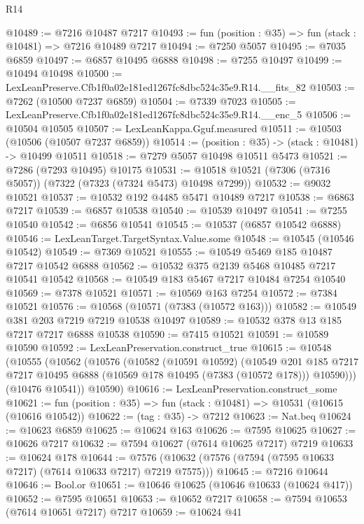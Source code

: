 \begin{lexlean}{R14}
\begin{coremodule}
@10489 := @7216 @10487 @7217
@10493 := fun (position : @35) => fun (stack : @10481) => @7216 @10489 @7217
@10494 := @7250 @5057
@10495 := @7035 @6859
@10497 := @6857 @10495 @6888
@10498 := @7255 @10497
@10499 := @10494 @10498
@10500 := LexLeanPreserve.Cfb1f0a02e181ed1267fc8dbc524c35e9.R14.__fits_82
@10503 := @7262 (@10500 @7237 @6859)
@10504 := @7339 @7023
@10505 := LexLeanPreserve.Cfb1f0a02e181ed1267fc8dbc524c35e9.R14.__enc_5
@10506 := @10504 @10505
@10507 := LexLeanKappa.Gguf.measured
@10511 := @10503 (@10506 (@10507 @7237 @6859))
@10514 := (position : @35) -> (stack : @10481) -> @10499 @10511
@10518 := @7279 @5057 @10498 @10511 @5473
@10521 := @7286 (@7293 @10495) @10175
@10531 := @10518 @10521 (@7306 (@7316 @5057)) (@7322 (@7323 (@7324 @5473) @10498 @7299))
@10532 := @9032 @10521
@10537 := @10532 @192 @4485 @5471 @10489 @7217
@10538 := @6863 @7217
@10539 := @6857 @10538
@10540 := @10539 @10497
@10541 := @7255 @10540
@10542 := @6856 @10541
@10545 := @10537 (@6857 @10542 @6888)
@10546 := LexLeanTarget.TargetSyntax.Value.some
@10548 := @10545 (@10546 @10542)
@10549 := @7369 @10521
@10555 := @10549 @5469 @185 @10487 @7217 @10542 @6888
@10562 := @10532 @375 @2139 @5468 @10485 @7217 @10541 @10542
@10568 := @10549 @183 @5467 @7217 @10484 @7254 @10540
@10569 := @7378 @10521
@10571 := @10569 @163 @7254
@10572 := @7384 @10521
@10576 := @10568 (@10571 (@7383 (@10572 @163)))
@10582 := @10549 @381 @203 @7219 @7219 @10538 @10497
@10589 := @10532 @378 @13 @185 @7217 @7217 @6888 @10538
@10590 := @7415 @10521
@10591 := @10589 @10590
@10592 := LexLeanPreservation.construct_true
@10615 := @10548
    (@10555
      (@10562
        (@10576
          (@10582
            (@10591 @10592)
            (@10549
              @201
              @185
              @7217
              @7217
              @10495
              @6888
              (@10569 @178 @10495 (@7383 (@10572 @178)))
              @10590)))
        (@10476 @10541))
      @10590)
@10616 := LexLeanPreservation.construct_some
@10621 := fun (position : @35) => fun (stack : @10481) => @10531 (@10615 (@10616 @10542))
@10622 := (tag : @35) -> @7212
@10623 := Nat.beq
@10624 := @10623 @6859
@10625 := @10624 @163
@10626 := @7595 @10625
@10627 := @10626 @7217
@10632 := @7594 @10627 (@7614 @10625 @7217) @7219
@10633 := @10624 @178
@10644 := @7576 (@10632 (@7576 (@7594 (@7595 @10633 @7217) (@7614 @10633 @7217) @7219 @7575)))
@10645 := @7216 @10644
@10646 := Bool.or
@10651 := @10646 @10625 (@10646 @10633 (@10624 @417))
@10652 := @7595 @10651
@10653 := @10652 @7217
@10658 := @7594 @10653 (@7614 @10651 @7217) @7217
@10659 := @10624 @41

\end{coremodule}
\end{lexlean}
